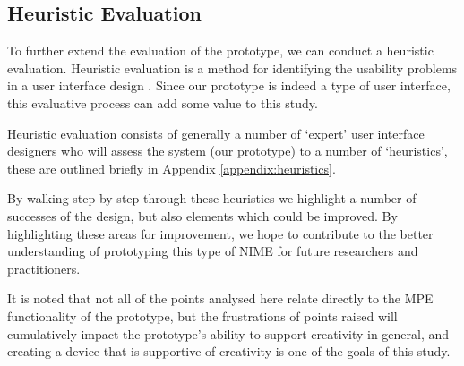 






\subsection{Heuristic Evaluation}

To further extend the evaluation of the prototype, we can conduct a heuristic evaluation. Heuristic evaluation is a method for identifying the usability problems in a user interface design \citep{nielsen_usability_1994, nielsen_heuristic_1990}. Since our prototype is indeed a type of user interface, this evaluative process can add some value to this study. 

Heuristic evaluation consists of generally a number of `expert' user interface designers who will assess the system (our prototype) to a number of `heuristics', these are outlined briefly in Appendix \ref{appendix:heuristics}.

By walking step by step through these heuristics we highlight a number of successes of the design, but also elements which could be improved. By highlighting these areas for improvement, we hope to contribute to the better understanding of prototyping this type of NIME for future researchers and practitioners. 

It is noted that not all of the points analysed here relate directly to the MPE functionality of the prototype, but the frustrations of points raised will cumulatively impact the prototype's ability to support creativity in general, and creating a device that is supportive of creativity is one of the goals of this study.


